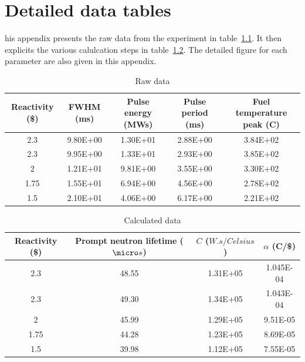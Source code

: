 \chapter{Detailed data tables}
\label{app:app01}

his appendix presents the raw data from the experiment in table~\ref{tab:data}. It then explicits the various calulcation steps in table~\ref{tab:data2}. The detailed figure for each parameter are also given in this appendix.

\begin{table}[!htb]
\centering
\caption{Raw data}
\label{tab:data}
\begin{tabular}{ccccc}
Reactivity (\$) & FWHM (ms) & Pulse energy (MWs) & Pulse period (ms) & Fuel temperature peak (C) \\ \hline\hline
2.3                              & 9.80E+00    & 1.30E+01              & 2.88E+00            & 3.84E+02              \\
2.3                              & 9.95E+00    & 1.33E+01              & 2.93E+00            & 3.85E+02              \\
2                                & 1.21E+01    & 9.81E+00              & 3.55E+00            & 3.30E+02              \\
1.75                             & 1.55E+01    & 6.94E+00              & 4.56E+00            & 2.78E+02              \\
1.5                              & 2.10E+01    & 4.06E+00              & 6.17E+00            & 2.21E+02             
\end{tabular}
\end{table}

\begin{table}[!htb]
\centering
\caption{Calculated data}
\label{tab:data2}
\begin{tabular}{cccc}
Reactivity (\$) & Prompt neutron lifetime ($\micro s$) & $C$ ($W.s/Celsius$) & $\alpha$ (C/\$) \\ \hline\hline
2.3                              & 48.55 & 1.31E+05 & 1.045E-04  \\
2.3                              & 49.30 & 1.34E+05 & 1.043E-04 \\
2                                & 45.99 & 1.29E+05 & 9.51E-05 \\
1.75                             & 44.28 & 1.23E+05 & 8.69E-05 \\
1.5                              & 39.98 & 1.12E+05 & 7.55E-05 
\end{tabular}
\end{table}




